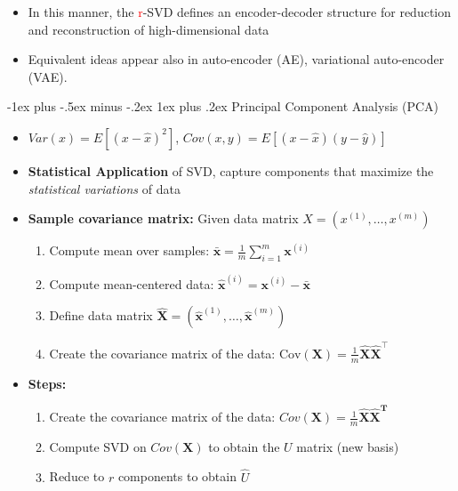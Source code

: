 \documentclass[10pt,landscape]{article}
\makeatletter
\renewcommand{\subsubsection}{\@startsection{subsubsection}{3}{0mm}%
                                {-1ex plus -.5ex minus -.2ex}%
                                {1ex plus .2ex}%
                                {\normalfont\small\bfseries}}
\makeatother
\begin{document}
\begin{multicols*}{3}
\begin{multicols}{2}
\begin{itemize}[topsep=0pt,noitemsep,wide=0pt, leftmargin=\dimexpr{} + 2\relax]
  \item In this manner, the \textcolor{red}{r}-SVD defines an encoder-decoder structure for reduction and reconstruction of high-dimensional data
  \item Equivalent ideas appear also in auto-encoder (AE), variational auto-encoder (VAE).
\end{itemize}
\end{multicols}

\subsubsection{Principal Component Analysis (PCA)}
\begin{itemize}[topsep=0pt,noitemsep,wide=0pt, leftmargin=\dimexpr{} + 2\relax]
  \item $Var(x) = E[(x - \hat{x})^2]$, $Cov(x,y) = E[(x-\hat{x})(y-\hat{y})]$
  \item \textbf{Statistical Application} of SVD, capture components that maximize the \textit{statistical variations} of data
  \item \textbf{Sample covariance matrix:} Given data matrix $X = (x^{(1)}, \ldots, x^{(m)})$
  \begin{enumerate}[topsep=0pt,noitemsep,wide=0pt, leftmargin=\dimexpr\labelwidth + 2\labelsep\relax]
    \item Compute mean over samples: $ \bar{\bm{x}} = \frac{1}{m} \sum_{i=1}^{m} \bm{x}^{(i)} $
    \item Compute mean-centered data: $ \hat{\bm{x}}^{(i)} = \bm{x}^{(i)} - \bar{\bm{x}} $
    \item Define data matrix $ \hat{\bm{X}} = \left( \hat{\bm{x}}^{(1)}, \dots, \hat{\bm{x}}^{(m)} \right) $
    \item Create the covariance matrix of the data: $ \text{Cov}(\bm{X}) = \frac{1}{m} \hat{\bm{X}} \hat{\bm{X}}^\top $
  \end{enumerate}
  \item \textbf{Steps:}
  \begin{enumerate}[topsep=0pt,noitemsep,wide=0pt, leftmargin=\dimexpr\labelwidth + 2\labelsep\relax]
    \item Create the covariance matrix of the data: $Cov(\bm{X}) = \frac{1}{m} \bm{\hat{X}\hat{X}^T}$
    \item Compute SVD on $Cov(\bm{X})$ to obtain the $U$ matrix (new basis)
    \item Reduce to $r$ components to obtain $\hat{U}$
  \end{enumerate}
\end{itemize}


\end{multicols*}
\end{document}
